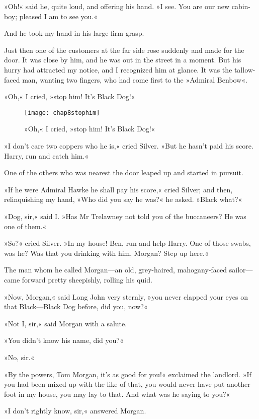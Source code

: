 »Oh!« said he, quite loud, and offering his hand. »I see. You are our new cabin-boy; pleased I am to see you.«

And he took my hand in his large firm grasp.

Just then one of the customers at the far side rose suddenly and made for the door. It was close by him, and he was out in the street in a moment. But his hurry had attracted my notice, and I recognized him at glance. It was the tallow-faced man, wanting two fingers, who had come first to the »Admiral Benbow«.

»Oh,« I cried, »stop him! It's Black Dog!«

\begin{sidewaysfigure}
\texttt{[image: chap8stophim]}%
\caption{»Oh,« I cried, »stop him! It's Black Dog!«}
\end{sidewaysfigure}

»I don't care two coppers who he is,« cried Silver. »But he hasn't paid his score. Harry, run and catch him.«

One of the others who was nearest the door leaped up and started in pursuit.

»If he were Admiral Hawke he shall pay his score,« cried Silver; and then, relinquishing my hand, »Who did you say he was?« he asked. »Black what?«

»Dog, sir,« said I. »Has Mr Trelawney not told you of the buccaneers? He was one of them.«

»So?« cried Silver. »In my house! Ben, run and help Harry. One of those swabs, was he? Was that you drinking with him, Morgan? Step up here.«

The man whom he called Morgan—an old, grey-haired, mahogany-faced sailor—came forward pretty sheepishly, rolling his quid.

»Now, Morgan,« said Long John very sternly, »you never clapped your eyes on that Black—Black Dog before, did you, now?«

»Not I, sir,« said Morgan with a salute.

»You didn't know his name, did you?«

»No, sir.«

»By the powers, Tom Morgan, it's as good for you!« exclaimed the landlord. »If you had been mixed up with the like of that, you would never have put another foot in my house, you may lay to that. And what was he saying to you?«

»I don't rightly know, sir,« answered Morgan.

